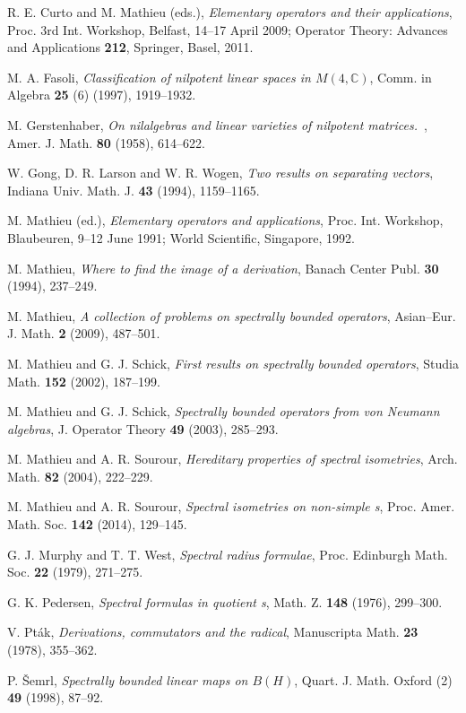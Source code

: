 \documentclass[a4paper,12pt,reqno]{amsart}
\numberwithin{equation}{section}
\theoremstyle{definition}
\begin{document}
\begin{thebibliography}{25}
R. E. Curto and M. Mathieu (eds.), \textit{Elementary operators and their applications},
Proc. 3rd Int. Workshop, Belfast, 14--17 April 2009;
Operator Theory: Advances and Applications \textbf{212}, Springer, Basel, 2011.

M. A. Fasoli, \textit{Classification of nilpotent linear spaces in $M(4, {\mathbb{C}})$},
Comm. in Algebra \textbf{25} (6) (1997), 1919--1932.

M. Gerstenhaber,  \textit{On nilalgebras and linear varieties of nilpotent matrices.}~,
Amer. J. Math. \textbf{80} (1958), 614--622.

W. Gong, D. R. Larson and W. R. Wogen, \textit{Two results on separating vectors},
Indiana Univ. Math. J. \textbf{43}  (1994), 1159--1165.

M. Mathieu (ed.), \textit{Elementary operators and applications},
Proc. Int. Workshop, Blaubeuren, 9--12 June 1991; World Scientific, Singapore, 1992.

M. Mathieu,  \textit{Where to find the image of a derivation},
Banach Center Publ. {\bf 30} (1994), 237--249.

M. Mathieu, \textit{A collection of  problems on spectrally bounded operators},
Asian--Eur. J. Math. {\bf2} (2009), 487--501.

M. Mathieu and G. J. Schick, \textit{First results on spectrally bounded operators},
Studia Math. {\bf 152} (2002), 187--199.

M. Mathieu and G. J. Schick, \textit{Spectrally bounded operators from von Neumann algebras},
J. Operator Theory {\bf49} (2003), 285--293.

M. Mathieu and A. R. Sourour, \textit{Hereditary properties of spectral isometries},
Arch. Math. {\bf82} (2004), 222--229.

M. Mathieu and A. R. Sourour, \textit{Spectral isometries on non-simple \C*s},
Proc. Amer. Math. Soc. {\bf142} (2014), 129--145.

G. J. Murphy and T. T. West, \textit{Spectral radius formulae},
Proc. Edinburgh Math. Soc. \textbf{22} (1979), 271--275.

G. K. Pedersen, \textit{Spectral formulas in quotient \C*s},
Math. Z. \textbf{148} (1976), 299--300.

V. Pt\'{a}k, \textit{Derivations, commutators and the radical},
Manuscripta Math. \textbf{23} (1978), 355--362.

P. \v{S}emrl, \textit{Spectrally bounded linear maps on $B(H)$},
Quart. J. Math. Oxford \textup{(2)} {\bf 49} (1998), 87--92.

\end{thebibliography}
\end{document}
